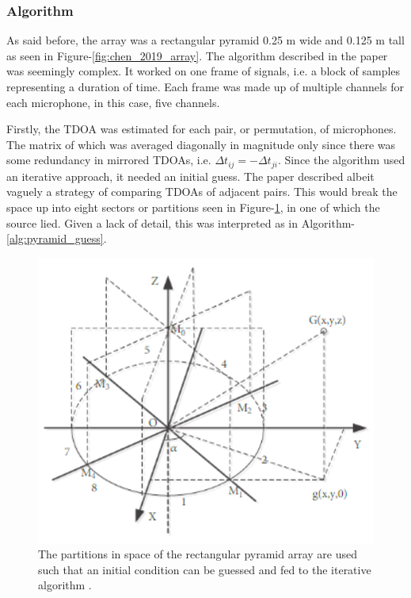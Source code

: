 \documentclass[notitlepage]{report}
\begin{document}
\subsubsection{Algorithm}

As said before, the array was a rectangular pyramid 0.25 \si{m} wide and 0.125 \si{m} tall as seen in Figure-\ref{fig:chen_2019_array}. The algorithm described in the paper \cite{chen_sound_2019} was seemingly complex. It worked on one frame of signals, i.e. a block of samples representing a duration of time. Each frame was made up of multiple channels for each microphone, in this case, five channels. 

Firstly, the TDOA was estimated for each pair, or permutation, of microphones. The matrix of which was averaged diagonally in magnitude only since there was some redundancy in mirrored TDOAs, i.e. $\Delta t_{ij} = -\Delta t_{ji}$. Since the algorithm used an iterative approach, it needed an initial guess. The paper described albeit vaguely a strategy of comparing TDOAs of adjacent pairs. This would break the space up into eight sectors or partitions seen in Figure-\ref{fig:chen_2019_partitions}, in one of which the source lied. Given a lack of detail, this was interpreted as in Algorithm-\ref{alg:pyramid_guess}.

\begin{figure}[H]
\includegraphics[width=1\textwidth]{./chen_2019/partitions.png}
\centering
\caption{The partitions in space of the rectangular pyramid array are used such that an initial condition can be guessed and fed to the iterative algorithm \cite{chen_sound_2019}.}
\label{fig:chen_2019_partitions}
\centering
\end{figure}
\end{document}
